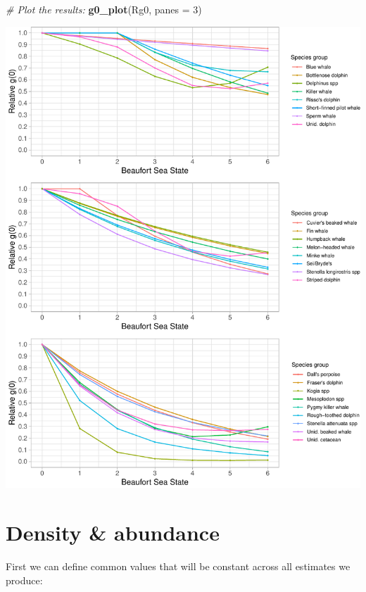 \documentclass[
]{book}
\newenvironment{Shaded}{\begin{snugshade}}{\end{snugshade}}
\newcommand{\CommentTok}[1]{\textcolor[rgb]{0.56,0.35,0.01}{\textit{#1}}}
\newcommand{\DataTypeTok}[1]{\textcolor[rgb]{0.13,0.29,0.53}{#1}}
\newcommand{\DecValTok}[1]{\textcolor[rgb]{0.00,0.00,0.81}{#1}}
\newcommand{\KeywordTok}[1]{\textcolor[rgb]{0.13,0.29,0.53}{\textbf{#1}}}
\newcommand{\NormalTok}[1]{#1}
\begin{document}
\begin{Shaded}
\begin{Highlighting}[]
\CommentTok{# Plot the results: }
\KeywordTok{g0_plot}\NormalTok{(Rg0, }\DataTypeTok{panes =} \DecValTok{3}\NormalTok{)}
\end{Highlighting}
\end{Shaded}

\includegraphics{figures/unnamed-chunk-278-1.pdf}

\hypertarget{density-abundance}{%
\section*{Density \& abundance}\label{density-abundance}}

First we can define common values that will be constant across all estimates we produce:
\end{document}
